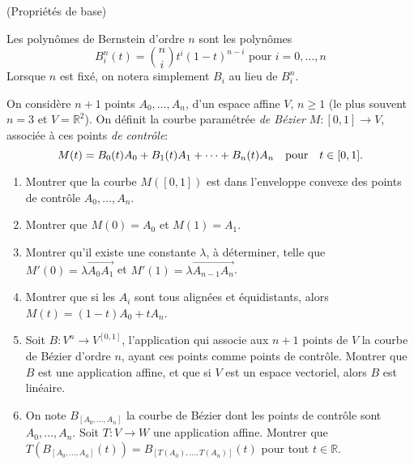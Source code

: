\documentclass[a4paper,12pt,reqno]{amsart}
\begin{document}


\begin{exo}\label{exo:base} (Propriétés de base)

  Les polynômes de Bernstein d'ordre $n$ sont les polynômes
  $$
    B_{i}^{n}(t) =\binom{n}{i}t^{i}(1-t)^{n-i} \text{ pour } i=0,\ldots,n
  $$
  Lorsque $n$ est fixé, on notera simplement $B_{i}$ au lieu de $B_{i}^{n}$.

  On considère $n + 1$ points $A_{0},\ldots,A_{n}$, d'un espace affine $V$, $n \geq 1$ (le plus souvent $n = 3$ et $V=\mathbb{R}^{2}$).
  On définit la courbe paramétrée \emph{de Bézier} $M:[0,1] \rightarrow V$, associée à ces points \emph{de contrôle}:
  $$
    M(t) = B_{0}(t) A_{0} + B_{1}(t) A_{1} + \cdots + B_{n}(t) A_{n}
      \text{\quad pour\quad} t \in [0,1].
  $$
  \begin{enumerate}
    \item Montrer que la courbe $M([0,1])$ est dans l'enveloppe convexe des points de contrôle $A_{0},\ldots,A_{n}$.

    \item Montrer que $M(0)=A_{0}$ et $M(1)=A_{1}$.

    \item\label{exo:base:bords} Montrer qu'il existe une constante $\lambda$, à déterminer, telle que $M'(0)=\lambda\overrightarrow{A_{0}A_{1}}$ et $M'(1)=\lambda\overrightarrow{A_{n-1}A_{n}}$.

    \item\label{exo:base:allignes} Montrer que si les $A_{i}$ sont tous alignées et équidistants, alors $M(t) = (1-t) A_{0} + t A_{n}$.

    \item\label{exo:base:B} Soit $B:V^{n} \longrightarrow V^{[0,1]}$, l'application qui associe aux $n+1$ points de $V$ la courbe de Bézier d'ordre $n$, ayant ces points comme points de contrôle.
    Montrer que $B$ est une application affine, et que si $V$ est un espace vectoriel, alors $B$ est linéaire.

    \item On note $B_{[A_{0},\ldots,A_{n}]}$ la courbe de Bézier dont les points de contrôle sont $A_{0},\ldots,A_{n}$. Soit $T:V \rightarrow W$ une application affine. Montrer que $T(B_{[A_{0},\ldots,A_{n}]}(t)) = B_{[T(A_{0}),\ldots,T(A_{n})]}(t)$ pour tout $t \in \mathbb{R}$.
  \end{enumerate}
\end{exo}
\end{document}
